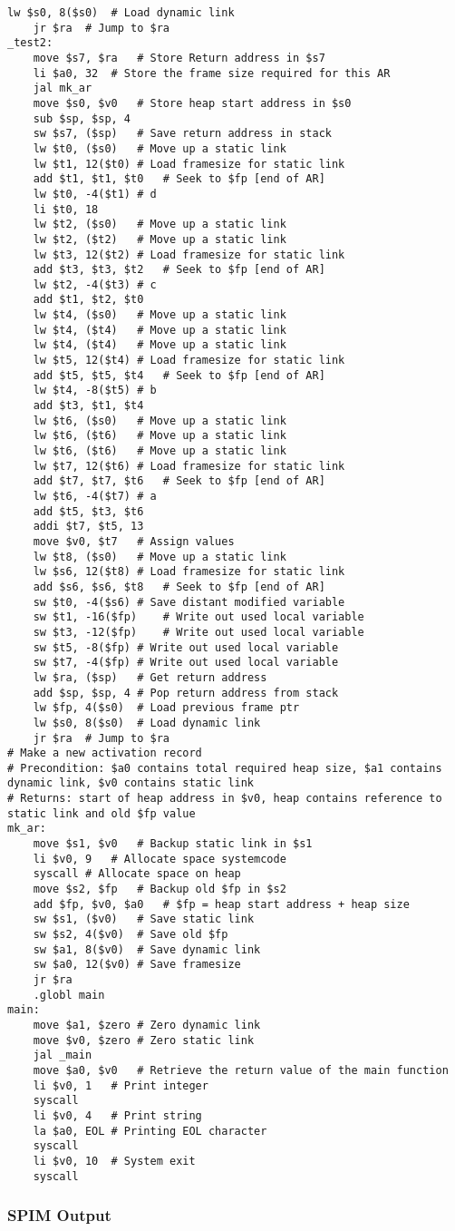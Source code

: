 \begin{lstlisting}[showstringspaces=false,breaklines=true,backgroundcolor=\color{light-gray}, captionpos=b]
	lw $s0, 8($s0)	# Load dynamic link
	jr $ra	# Jump to $ra
_test2:
	move $s7, $ra	# Store Return address in $s7
	li $a0, 32	# Store the frame size required for this AR
	jal mk_ar
	move $s0, $v0	# Store heap start address in $s0
	sub $sp, $sp, 4
	sw $s7, ($sp)	# Save return address in stack
	lw $t0, ($s0)	# Move up a static link
	lw $t1, 12($t0)	# Load framesize for static link
	add $t1, $t1, $t0	# Seek to $fp [end of AR]
	lw $t0, -4($t1)	# d
	li $t0, 18
	lw $t2, ($s0)	# Move up a static link
	lw $t2, ($t2)	# Move up a static link
	lw $t3, 12($t2)	# Load framesize for static link
	add $t3, $t3, $t2	# Seek to $fp [end of AR]
	lw $t2, -4($t3)	# c
	add $t1, $t2, $t0
	lw $t4, ($s0)	# Move up a static link
	lw $t4, ($t4)	# Move up a static link
	lw $t4, ($t4)	# Move up a static link
	lw $t5, 12($t4)	# Load framesize for static link
	add $t5, $t5, $t4	# Seek to $fp [end of AR]
	lw $t4, -8($t5)	# b
	add $t3, $t1, $t4
	lw $t6, ($s0)	# Move up a static link
	lw $t6, ($t6)	# Move up a static link
	lw $t6, ($t6)	# Move up a static link
	lw $t7, 12($t6)	# Load framesize for static link
	add $t7, $t7, $t6	# Seek to $fp [end of AR]
	lw $t6, -4($t7)	# a
	add $t5, $t3, $t6
	addi $t7, $t5, 13
	move $v0, $t7	# Assign values
	lw $t8, ($s0)	# Move up a static link
	lw $s6, 12($t8)	# Load framesize for static link
	add $s6, $s6, $t8	# Seek to $fp [end of AR]
	sw $t0, -4($s6)	# Save distant modified variable
	sw $t1, -16($fp)	# Write out used local variable
	sw $t3, -12($fp)	# Write out used local variable
	sw $t5, -8($fp)	# Write out used local variable
	sw $t7, -4($fp)	# Write out used local variable
	lw $ra, ($sp)	# Get return address
	add $sp, $sp, 4	# Pop return address from stack
	lw $fp, 4($s0)	# Load previous frame ptr
	lw $s0, 8($s0)	# Load dynamic link
	jr $ra	# Jump to $ra
# Make a new activation record
# Precondition: $a0 contains total required heap size, $a1 contains dynamic link, $v0 contains static link
# Returns: start of heap address in $v0, heap contains reference to static link and old $fp value
mk_ar:
	move $s1, $v0	# Backup static link in $s1
	li $v0, 9	# Allocate space systemcode
	syscall	# Allocate space on heap
	move $s2, $fp	# Backup old $fp in $s2
	add $fp, $v0, $a0	# $fp = heap start address + heap size
	sw $s1, ($v0)	# Save static link
	sw $s2, 4($v0)	# Save old $fp
	sw $a1, 8($v0)	# Save dynamic link
	sw $a0, 12($v0)	# Save framesize
	jr $ra
	.globl main
main:
	move $a1, $zero	# Zero dynamic link
	move $v0, $zero	# Zero static link
	jal _main
	move $a0, $v0	# Retrieve the return value of the main function
	li $v0, 1	# Print integer
	syscall
	li $v0, 4	# Print string
	la $a0, EOL	# Printing EOL character
	syscall
	li $v0, 10	# System exit
	syscall

\end{lstlisting}\subsubsection{SPIM Output}
